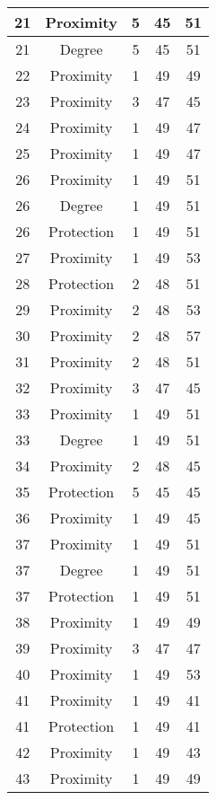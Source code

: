 \documentclass[results.tex]{subfiles}
\begin{document}
\begin{center}
\begin{tabular}{| c || c | c | c | c |}
    21 & Proximity & 5 & 45 & 51 \\ 
    \hline
    21 & Degree & 5 & 45 & 51 \\ 
    \hline
    22 & Proximity & 1 & 49 & 49 \\ 
    \hline
    23 & Proximity & 3 & 47 & 45 \\ 
    \hline
    24 & Proximity & 1 & 49 & 47 \\ 
    \hline
    25 & Proximity & 1 & 49 & 47 \\ 
    \hline
    26 & Proximity & 1 & 49 & 51 \\ 
    \hline
    26 & Degree & 1 & 49 & 51 \\ 
    \hline
    26 & Protection & 1 & 49 & 51 \\ 
    \hline
    27 & Proximity & 1 & 49 & 53 \\ 
    \hline
    28 & Protection & 2 & 48 & 51 \\ 
    \hline
    29 & Proximity & 2 & 48 & 53 \\ 
    \hline
    30 & Proximity & 2 & 48 & 57 \\ 
    \hline
    31 & Proximity & 2 & 48 & 51 \\ 
    \hline
    32 & Proximity & 3 & 47 & 45 \\ 
    \hline
    33 & Proximity & 1 & 49 & 51 \\ 
    \hline
    33 & Degree & 1 & 49 & 51 \\ 
    \hline
    34 & Proximity & 2 & 48 & 45 \\ 
    \hline
    35 & Protection & 5 & 45 & 45 \\ 
    \hline
    36 & Proximity & 1 & 49 & 45 \\ 
    \hline
    37 & Proximity & 1 & 49 & 51 \\ 
    \hline
    37 & Degree & 1 & 49 & 51 \\ 
    \hline
    37 & Protection & 1 & 49 & 51 \\ 
    \hline
    38 & Proximity & 1 & 49 & 49 \\ 
    \hline
    39 & Proximity & 3 & 47 & 47 \\ 
    \hline
    40 & Proximity & 1 & 49 & 53 \\ 
    \hline
    41 & Proximity & 1 & 49 & 41 \\ 
    \hline
    41 & Protection & 1 & 49 & 41 \\ 
    \hline
    42 & Proximity & 1 & 49 & 43 \\ 
    \hline
    43 & Proximity & 1 & 49 & 49 \\ 

\end{tabular}
\end{center}
\end{document}
